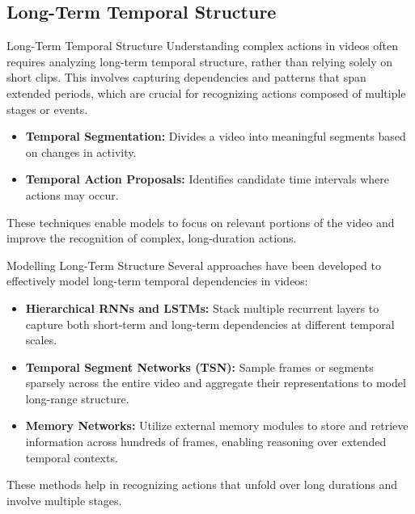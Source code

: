 \subsection{Long-Term Temporal Structure}
\begin{frame}{Long-Term Temporal Structure}
    Understanding complex actions in videos often requires analyzing long-term temporal structure, rather than relying solely on short clips. This involves capturing dependencies and patterns that span extended periods, which are crucial for recognizing actions composed of multiple stages or events.

    \begin{itemize}
        \item \textbf{Temporal Segmentation:} Divides a video into meaningful segments based on changes in activity.
        \item \textbf{Temporal Action Proposals:} Identifies candidate time intervals where actions may occur.
    \end{itemize}

    These techniques enable models to focus on relevant portions of the video and improve the recognition of complex, long-duration actions.
\end{frame}

\begin{frame}{Modelling Long-Term Structure}
    Several approaches have been developed to effectively model long-term temporal dependencies in videos:

    \begin{itemize}
        \item \textbf{Hierarchical RNNs and LSTMs:} Stack multiple recurrent layers to capture both short-term and long-term dependencies at different temporal scales.
        \item \textbf{Temporal Segment Networks (TSN):} Sample frames or segments sparsely across the entire video and aggregate their representations to model long-range structure.
        \item \textbf{Memory Networks:} Utilize external memory modules to store and retrieve information across hundreds of frames, enabling reasoning over extended temporal contexts.
    \end{itemize}

    These methods help in recognizing actions that unfold over long durations and involve multiple stages.
\end{frame}

